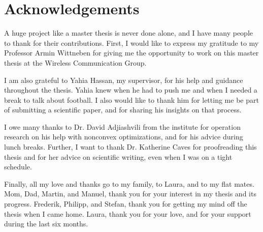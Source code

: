 \section*{Acknowledgements}

A huge project like a master thesis is never done alone, and I have many people to thank for their contributions.
First, I would like to express my gratitude to my Professor Armin Wittneben for giving me the opportunity to work on this master thesis at the Wireless Communication Group.

I am also grateful to Yahia Hassan, my supervisor, for his help and guidance throughout the thesis. 
Yahia knew when he had to push me and when I needed a break to talk about football.
I also would like to thank him for letting me be part of submitting a scientific paper, and for sharing his insights on that process.

I owe many thanks to Dr. David Adjiashvili from the institute for operation research on his help with nonconvex optimizations, and for his advice during lunch breaks.
Further, I want to thank Dr. Katherine Caves for proofreading this thesis and for her advice on scientific writing, even when I was on a tight schedule.

Finally, all my love and thanks go to my family, to Laura, and to my flat mates.
Mom, Dad, Martin, and Manuel, thank you for your interest in my thesis and its progress.
Frederik, Philipp, and Stefan, thank you for getting my mind off the thesis when I came home.
Laura, thank you for your love, and for your support during the last six months.

